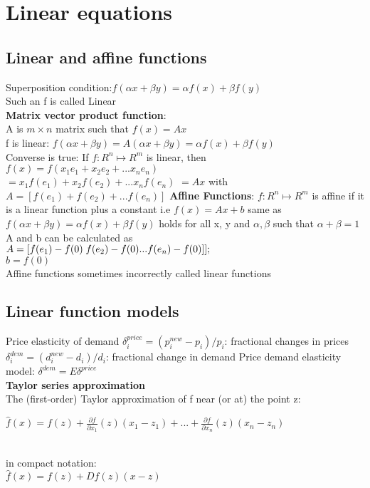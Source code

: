 \section{Linear equations}
\subsection{Linear and affine functions}
\textbullet Superposition condition:$f(\alpha x + \beta y) = \alpha f(x) + \beta f(y)$\\
\textbullet Such an f is called Linear\\
\textbf{Matrix vector product function}:\\
\textbullet A is $m \times n$ matrix such that $f(x)=Ax$\\
\textbullet f is linear:  $f(\alpha x + \beta y)=A(\alpha x + \beta y)=\alpha f(x) + \beta f(y)$\\
\textbullet Converse is true: If $f:R^{n} \mapsto R^{m}$ is linear, then \\
$f(x)=f(x_{1}e_{1}+x_{2}e_{2}+...x_{n}e_{n})$\\
$=x_{1}f(e_{1})+x_{2}f(e_{2})+...x_{n}f(e_{n})$
$=Ax$ with $A = [f(e_{1})+f(e_{2})+...f(e_{n})]$
\newline \textbf{Affine Functions}: $f:R^{n} \mapsto R^{m}$ is affine if it is a linear function plus a constant i.e $f(x)=Ax+b$ same as $f(\alpha x + \beta y)=\alpha f(x)+\beta f(y)$ holds for all x, y and $\alpha,\beta$ such that $\alpha+\beta=1$ 
\newline A and b can be calculated as \\
$A=[f(e_{1})-f(0)\thickspace f(e_{2})-f(0) ... f(e_{n})-f(0)]] ; $\\
$b= f(0)$\\
\textbullet Affine functions sometimes incorrectly called linear functions
\subsection{Linear function models}
Price elasticity of demand
$\delta_i^{price}=(p_i^{new}-p_{i})/p_{i}$: fractional changes in prices
$\delta_i^{dem}=(d_i^{new}-d_{i})/d_{i}$: fractional change in demand
Price demand elasticity model: $\delta^{dem}=E\delta^{price}$\\
\textbf{Taylor series approximation}\\
\textbullet The (first-order) Taylor approximation of f near (or at) the point z:\\
\begin{scriptsize}
$\hat{f}(x)= f(z) + \frac{\partial f}{\partial x_1}(z)(x_1 - z_1) + ... +  \frac{\partial f}{\partial x_n}(z)(x_n - z_n)$
\end{scriptsize}\\
\textbullet in compact notation:  \\$\hat{f}(x) = f (z) + Df (z)(x - z)$
